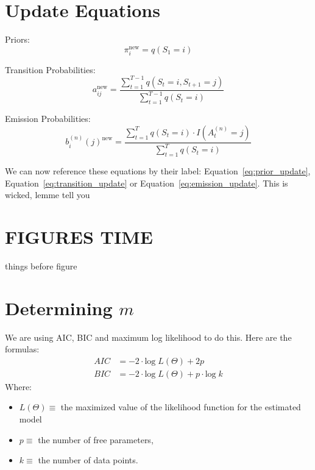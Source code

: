 \section{Update Equations}
Priors:
\begin{equation}
\pi_i^{\text{new}} = q(S_1=i)
\label{eq:prior_update}
\end{equation}

Transition Probabilities:
\begin{equation}
a_{ij}^{\text{new}} = \frac{\sum\limits_{t=1}^{T - 1} q(S_t=i,S_{t+1}=j)}{\sum\limits_{t=1}^{T-1} q(S_t=i)}
\label{eq:transition_update}
\end{equation}


Emission Probabilities:
\begin{equation}
b_i^{(n)}(j)^{\text{new}} = \frac{\sum\limits_{t=1}^T q(S_t = i) \cdot I(A_t^{(n)} = j)}{\sum\limits_{t=1}^T q(S_t = i)}
\label{eq:emission_update}
\end{equation}

We can now reference these equations by their label: Equation~\ref{eq:prior_update}, Equation~\ref{eq:transition_update} or Equation~\ref{eq:emission_update}. This is wicked, lemme tell you

\newpage

\section{FIGURES TIME}

things before figure



\section{Determining $m$}


We are using AIC, BIC and maximum log likelihood to do this. Here are the formulas:
\[
    \begin{aligned}
        AIC &= -2 \cdot \text{log} \; L(\Theta) + 2p \\
        BIC &= -2 \cdot \text{log} \; L(\Theta) + p \cdot \text{log} \; k
    \end{aligned}
\]
Where:
\begin{itemize}
    \item $L(\Theta) \equiv$ the maximized value of the likelihood function for the estimated model
    \item $p \equiv$ the number of free parameters, 
    \item $k \equiv$ the number of data points. 
\end{itemize}


